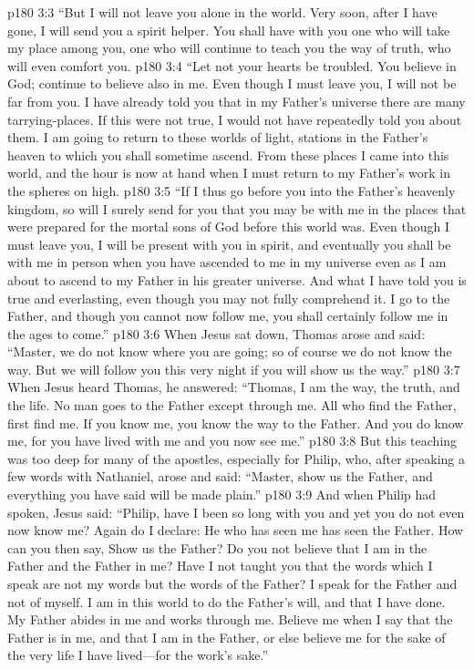 \vs p180 3:3 \textcolor{ubdarkred}{“But I will not leave you alone in the world. Very soon, after I have gone, I will send you a spirit helper. You shall have with you one who will take my place among you, one who will continue to teach you the way of truth, who will even comfort you.}
\vs p180 3:4 “Let not your hearts be troubled. You believe in God; continue to believe also in me. Even though I must leave you, I will not be far from you. I have already told you that in my Father’s universe there are many tarrying\hyp{}places. If this were not true, I would not have repeatedly told you about them. I am going to return to these worlds of light, stations in the Father’s heaven to which you shall sometime ascend. From these places I came into this world, and the hour is now at hand when I must return to my Father’s work in the spheres on high.
\vs p180 3:5 \textcolor{ubdarkred}{“If I thus go before you into the Father’s heavenly kingdom, so will I surely send for you that you may be with me in the places that were prepared for the mortal sons of God before this world was. Even though I must leave you, I will be present with you in spirit, and eventually you shall be with me in person when you have ascended to me in my universe even as I am about to ascend to my Father in his greater universe. And what I have told you is true and everlasting, even though you may not fully comprehend it. I go to the Father, and though you cannot now follow me, you shall certainly follow me in the ages to come.”}
\vs p180 3:6 When Jesus sat down, Thomas arose and said: “Master, we do not know where you are going; so of course we do not know the way. But we will follow you this very night if you will show us the way.”
\vs p180 3:7 When Jesus heard Thomas, he answered: \textcolor{ubdarkred}{“Thomas, I am the way, the truth, and the life. No man goes to the Father except through me. All who find the Father, first find me. If you know me, you know the way to the Father. And you do know me, for you have lived with me and you now see me.”}
\vs p180 3:8 But this teaching was too deep for many of the apostles, especially for Philip, who, after speaking a few words with Nathaniel, arose and said: “Master, show us the Father, and everything you have said will be made plain.”
\vs p180 3:9 And when Philip had spoken, Jesus said: \textcolor{ubdarkred}{“Philip, have I been so long with you and yet you do not even now know me? Again do I declare: He who has seen me has seen the Father. How can you then say, Show us the Father? Do you not believe that I am in the Father and the Father in me? Have I not taught you that the words which I speak are not my words but the words of the Father? I speak for the Father and not of myself. I am in this world to do the Father’s will, and that I have done. My Father abides in me and works through me. Believe me when I say that the Father is in me, and that I am in the Father, or else believe me for the sake of the very life I have lived---for the work’s sake.”}
